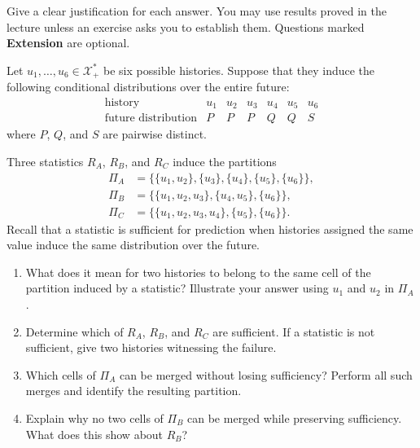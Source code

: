 \documentclass[11pt]{article}
\begin{document}
\begin{callout}[note][Instructions]
    Give a clear justification for each answer. You may use results proved in
    the lecture unless an exercise asks you to establish them. Questions marked
    \textbf{Extension} are optional.
\end{callout}


\begin{exercise}
\label{ex:p2-1}
  Let $u_1,\ldots,u_6\in\mathcal X_+^*$ be six possible histories. Suppose
  that they induce the following conditional distributions over the entire
  future:
  \[
    \begin{array}{c|cccccc}
      \text{history} & u_1 & u_2 & u_3 & u_4 & u_5 & u_6\\
      \hline
      \text{future distribution} & P & P & P & Q & Q & S
    \end{array}
  \]
  where $P$, $Q$, and $S$ are pairwise distinct.

  Three statistics $R_A$, $R_B$, and $R_C$ induce the partitions
  \[
    \begin{aligned}
      \Pi_A
        &=\bigl\{\{u_1,u_2\},\{u_3\},\{u_4\},\{u_5\},\{u_6\}\bigr\},\\
      \Pi_B
        &=\bigl\{\{u_1,u_2,u_3\},\{u_4,u_5\},\{u_6\}\bigr\},\\
      \Pi_C
        &=\bigl\{\{u_1,u_2,u_3,u_4\},\{u_5\},\{u_6\}\bigr\}.
    \end{aligned}
  \]
  Recall that a statistic is sufficient for prediction when histories assigned
  the same value induce the same distribution over the future.

  \begin{enumerate}
    \item What does it mean for two histories to belong to the same cell of the
      partition induced by a statistic? Illustrate your answer using $u_1$ and
      $u_2$ in $\Pi_A$.

    \item Determine which of $R_A$, $R_B$, and $R_C$ are sufficient. If a
      statistic is not sufficient, give two histories witnessing the failure.

    \item Which cells of $\Pi_A$ can be merged without losing sufficiency?
      Perform all such merges and identify the resulting partition.

    \item Explain why no two cells of $\Pi_B$ can be merged while preserving
      sufficiency. What does this show about $R_B$?


\end{enumerate}
\end{exercise}
\end{document}
